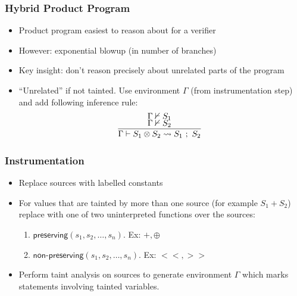 \documentclass{beamer} %
\theoremstyle{definition} %
\newcommand{\cross}{\otimes{}}
\begin{document}
    \begin{frame}
        \frametitle{Hybrid Product Program}
        
        \begin{itemize}
           \item Product program easiest to reason about for a verifier
           \item However: exponential blowup (in number of branches)
           \pause
            \item Key insight: don't reason precisely about unrelated parts of the program
            \item ``Unrelated'' if not tainted. Use environment $\Gamma$ (from instrumentation step) and add following inference rule:
            \[
                \begin{array}{c}
                    \infer[]{\Gamma \vdash S_1 \cross S_2 \leadsto S_1\ ;\ S_2}{
                        \Gamma \nvdash S_1 \\
                        \Gamma \nvdash S_2
                    } \\
                \end{array}
            \]
        \end{itemize}
            
        \end{frame}



\begin{frame}
\frametitle{Instrumentation}
    
\begin{itemize}
    \item Replace sources with labelled constants
    \item For values that are tainted by more than one source (for example $S_1 + S_2$) replace with one of two uninterpreted functions over the sources: \begin{enumerate}
		\item $\textsf{preserving}(s_1, s_2, \ldots, s_n)$. Ex: $+, \oplus$
		\item $\textsf{non-preserving}(s_1, s_2, \ldots, s_n)$. Ex: $<<, >>$
    \end{enumerate}
    \item Perform taint analysis on sources to generate environment $\Gamma$ which marks statements involving tainted variables.
\end{itemize}

\end{frame}
\end{document}

